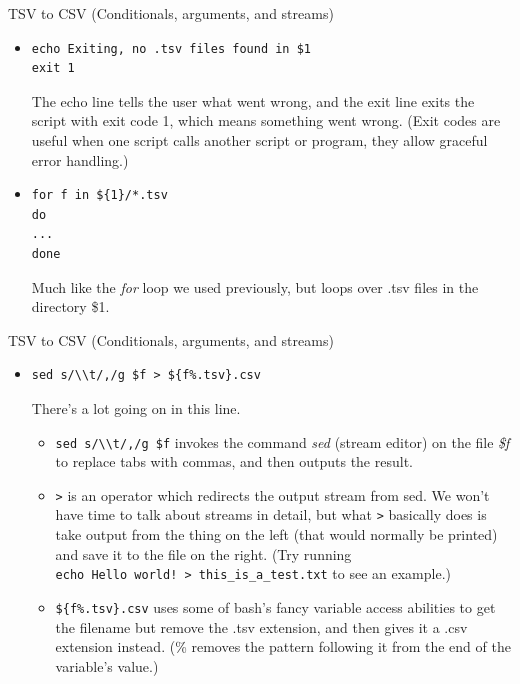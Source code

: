 \documentclass{beamer}
\begin{document}
\begin{frame}[fragile]{TSV to CSV (Conditionals, arguments, and streams)}
\begin{itemize}
\item<1->
\begin{lstlisting}
echo Exiting, no .tsv files found in $1
exit 1
\end{lstlisting} 
The echo line tells the user what went wrong, and the exit line exits the script with exit code 1, which means something went wrong. (Exit codes are useful when one script calls another script or program, they allow graceful error handling.)
\item<2->
\begin{lstlisting}
for f in ${1}/*.tsv
do
...
done
\end{lstlisting}
Much like the \emph{for} loop we used previously, but loops over .tsv files in the directory \$1.
\end{itemize}
\end{frame}

\begin{frame}[fragile]{TSV to CSV (Conditionals, arguments, and streams)}
\begin{itemize}
\item<1->
\begin{lstlisting}
sed s/\\t/,/g $f > ${f%.tsv}.csv
\end{lstlisting} 
There's a lot going on in this line.
\begin{itemize}
    \item<2-> \lstinline|sed s/\\t/,/g $f| invokes the command \emph{sed} (stream editor) on the file \emph{\$f} to replace tabs with commas, and then outputs the result.
    \item<3-> \lstinline|>| is an operator which redirects the output stream from sed. We won't have time to talk about streams in detail, but what \lstinline|>| basically does is take output from the thing on the left (that would normally be printed) and save it to the file on the right. (Try running \\\lstinline|echo Hello world! > this_is_a_test.txt| to see an example.)
    \item<4-> \lstinline|${f%.tsv}.csv| uses some of bash's fancy variable access abilities to get the filename but remove the .tsv extension, and then gives it a .csv extension instead. (\% removes the pattern following it from the end of the variable's value.)
\end{itemize} 
\end{itemize}
\end{frame}
\end{document}
